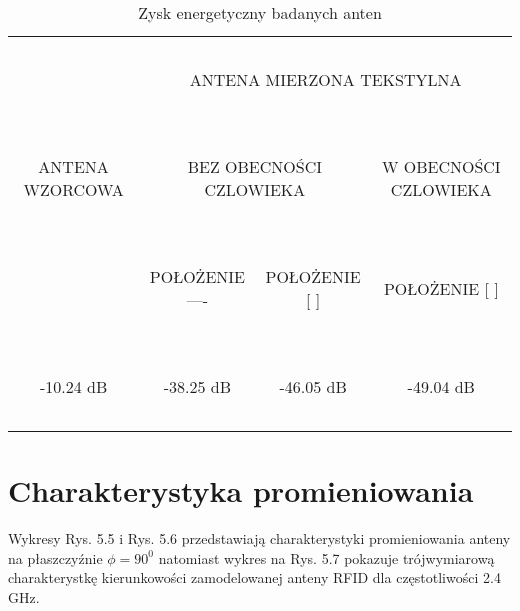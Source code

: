 \begin{table}[h!]
\begin{center}
    \begin{tabular}{|c|c|c|c|}
    \hline
    ~               & \multicolumn{3}{c|}{~}     \\
    ~               & \multicolumn{3}{c|}{ANTENA MIERZONA TEKSTYLNA } \\
    ~               & \multicolumn{3}{c|}{~}     \\ \hline
    ~               & \multicolumn{2}{c|}{~}     & ~                                  \\
    ANTENA WZORCOWA & \multicolumn{2}{c|}{BEZ OBECNOŚCI CZLOWIEKA} & W OBECNOŚCI CZLOWIEKA              \\
    ~               & \multicolumn{2}{c|}{~}     & ~                                  \\ \hline
    ~               & ~                          & ~                                  & ~                                  \\
    ~               & POŁOŻENIE ----             & POŁOŻENIE [     ]                  & POŁOŻENIE [    ]                   \\
    ~               & ~                          & ~                                  & ~                                  \\ \hline
    ~               & ~                          & ~                                  & ~                                  \\
    -10.24 dB       & -38.25 dB                  & -46.05 dB                          & -49.04 dB                          \\
    ~               & ~                          & ~                                  & ~                                  \\ \hline
    \end{tabular}
    \caption{Zysk energetyczny badanych anten}
\end{center}
\end{table}




\newpage
\section{Charakterystyka promieniowania}
Wykresy Rys. 5.5 i Rys. 5.6 przedstawiają charakterystyki promieniowania anteny na płaszczyźnie $\phi = 90^{0}$ natomiast wykres na Rys. 5.7 pokazuje trójwymiarową charakterystkę kierunkowości zamodelowanej anteny RFID dla częstotliwości 2.4 GHz.




